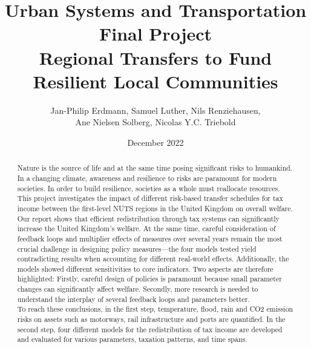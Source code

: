 \documentclass[10pt,a4paper]{article}
\title{\vspace{.0cm}Urban Systems and Transportation \\ Final Project \vspace{5.5cm}\\ \textbf{Regional Transfers to Fund Resilient Local Communities}\vspace{3.5 cm}}
\author{Jan-Philip Erdmann, Samuel Luther, Nils Renziehausen, \\Ane Nielsen Solberg, Nicolas Y.C. Triebold\vspace{1cm}}
\date{December 2022}
\begin{document}
\maketitle
\newpage
{}


\begin{abstract}
Nature is the source of life and at the same time posing significant risks to humankind. In a changing climate, awareness and resilience to risks are paramount for modern societies. In order to build resilience, societies as a whole must reallocate resources. This project investigates the impact of different risk-based transfer schedules for tax income between the first-level NUTS regions in the United Kingdom on overall welfare.
\\
Our report shows that efficient redistribution through tax systems can significantly increase the United Kingdom's welfare. At the same time, careful consideration of feedback loops and multiplier effects of measures over several years remain the most crucial challenge in designing policy measures—the four models tested yield contradicting results when accounting for different real-world effects. Additionally, the models showed different sensitivities to core indicators. Two aspects are therefore highlighted: Firstly, careful design of policies is paramount because small parameter changes can significantly affect welfare. Secondly, more research is needed to understand the interplay of several feedback loops and parameters better.
\\
To reach these conclusions, in the first step, temperature, flood, rain and CO2 emission risks on assets such as motorways, rail infrastructure and ports are quantified. In the second step, four different models for the redistribution of tax income are developed and evaluated for various parameters, taxation patterns, and time spans.
\end{abstract}
\newpage
\tableofcontents
\newpage
\end{document}
